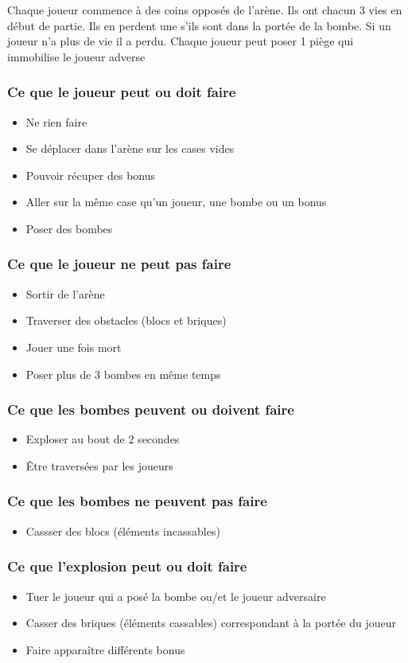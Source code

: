 \documentclass[a4paper,11pt,french]{article}
\begin{document}
Chaque joueur commence à des coins opposés de l'arène. Ils ont chacun 3 vies en début de partie. Ils en perdent une s'ils sont dans la portée de la bombe. Si un joueur n'a plus de vie il a perdu. Chaque joueur peut poser 1 piège qui immobilise le joueur adverse
\subsubsection{Ce que le joueur peut ou doit faire}
\begin{itemize}
\item Ne rien faire
\item Se déplacer dans l'arène sur les cases vides
\item Pouvoir récuper des bonus
\item Aller sur la même case qu'un joueur, une bombe ou un bonus
\item Poser des bombes
\end{itemize}
\subsubsection{Ce que le joueur ne peut pas faire}
\begin{itemize}
\item Sortir de l'arène
\item Traverser des obstacles (blocs et briques)
\item Jouer une fois mort
\item Poser plus de 3 bombes en même temps
\end{itemize}
\subsubsection{Ce que les bombes peuvent ou doivent faire}
\begin{itemize}
\item Exploser au bout de 2 secondes
\item Être traversées par les joueurs
\end{itemize}
\subsubsection{Ce que les bombes ne peuvent pas faire}
\begin{itemize}
\item Cassser des blocs (éléments incassables)
\end{itemize}
\subsubsection{Ce que l'explosion peut ou doit faire}
\begin{itemize}
\item Tuer le joueur qui a posé la bombe ou/et le joueur adversaire
\item Casser des briques (éléments cassables) correspondant à la portée du joueur
\item Faire apparaître différents bonus
\end{itemize}
\end{document}
